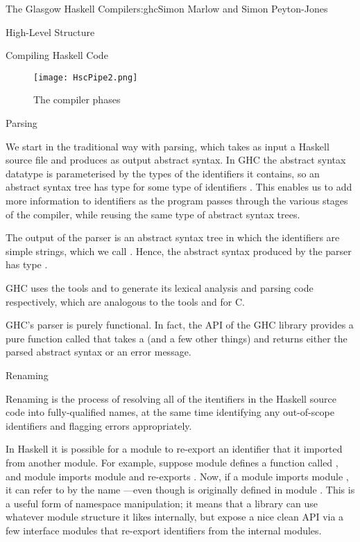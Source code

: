 \begin{aosachapter}{The Glasgow Haskell Compiler}{s:ghc}{Simon Marlow and Simon Peyton-Jones}
\begin{aosasect1}{High-Level Structure}
\begin{aosasect2}{Compiling Haskell Code}
\begin{figure}
\begin{center}
\texttt{[image: HscPipe2.png]}
\end{center}
\caption{The compiler phases}
\label{f:pipeline}
\end{figure}

\begin{aosasect3}{Parsing}

We start in the traditional way with parsing, which takes as input a
Haskell source file and produces as output abstract syntax.  In GHC
the abstract syntax datatype  is parameterised by the
types of the identifiers it contains, so an abstract syntax tree has
type  for some type of identifiers .  This
enables us to add more information to identifiers as the program
passes through the various stages of the compiler, while reusing the
same type of abstract syntax trees.

The output of the parser is an abstract syntax tree in which the
identifiers are simple strings, which we call .  Hence,
the abstract syntax produced by the parser has type .

GHC uses the tools  and  to generate its
lexical analysis and parsing code respectively, which are analogous to
the tools  and  for C.

GHC's parser is purely functional.  In fact, the API of the GHC
library provides a pure function called  that takes a
 (and a few other things) and returns either the parsed
abstract syntax or an error message.

\end{aosasect3}

\begin{aosasect3}{Renaming}

Renaming is the process of resolving all of the itentifiers in the
Haskell source code into fully-qualified names, at the same time
identifying any out-of-scope identifiers and flagging errors
appropriately.

In Haskell it is possible for a module to re-export an identifier that
it imported from another module.  For example, suppose module 
defines a function called , and module  imports module
 and re-exports .  Now, if a module  imports
module , it can refer to  by the name
---even though  is originally defined in module
.  This is a useful form of namespace manipulation; it means
that a library can use whatever module structure it likes internally,
but expose a nice clean API via a few interface modules that re-export
identifiers from the internal modules.


\end{aosasect3}
\end{aosasect2}
\end{aosasect1}
\end{aosachapter}
